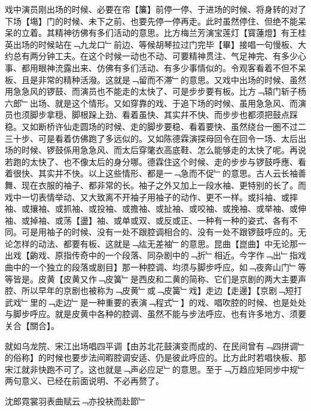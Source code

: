 \documentclass{zhvt-classic}
\begin{document}
戏中演员刚出场的时候、必要在帘【簾】前停一停、于进场的时候、将身转的对了下场【塲】门的时候、未下之前、也要先停一停再走。此时虽然停住、但绝不能呆呆的立着。其精神彷佛有多们活动的意思。比方梅兰芳演宝莲灯【寳蓮燈】有王桂英出场的时候站在﹁九龙口﹂前边、等候胡琴拉过门完毕【畢】接唱一句慢板、大约总有两分钟工夫。在这个时候一动也不动、可要精神贯注、气足神完、有多少心事、都用眼神㳘露出来、仿佛有多们活动、有多少事情似的。令观客看着不但不呆板、且是非常的精种活潑。这就是﹁留而不滞﹂的意思。又戏中出场的时候、虽然用急急风的锣鼓、而演员也不能走的太快了、可是步步要有板。比方﹁辕门斩子杨六郎﹂出场、就是这个情形。又如穿靠的戏、于追下场的时候、虽用急急风、而演员也须脚步拿穏、脚根跺上劲、看着虽快、其实幷不快、而步步也都须把鼓点踩稳。又如断桥许仙走圆场的时候、走的脚步要稳、看着要快、虽然绕台一圏不过二三十步、可是看着仿佛跑了多远似的。又如陈德霖演探母回令在回令一场、太后出场的时候、锣鼓係用急急风、而太后穿氅衣高底鞋、怎么能够走的太快了呢。再说若跑的太快了、也不像太后的身分哪。德霖住这个时候、走的步步与锣鼓呼應、看着很快、其实并不快。以上这些情形、都是一﹁急而不促﹂的意思。古人云长袖善舞、现在衣服的袖子、都非常的长。袖子之外又加上一段水袖、更特别的长了。而戏中一切表情举动、又大致离不开袖子用袖子的动作、更不一样。或抖袖、或摔袖、或攘袖、或抓袖、或投袖、或擔袖、或扯袖、或咬袖、或挽袖、或举袖、或伸袖、或掉袖、或荡【盪】袖、或单或双、或反或正、一种有一种的姿式、各有不同。可是用袖子的时候、没有一处不跟腔调相合的、没有一处不跟锣鼓呼应的。无论怎样的动法、都要有板、这就是﹁纮无差袖﹂的意思。昆曲【崑曲】中无论那一出戏【齣戏、原指传奇中的一个段落、同杂剧中的﹁折﹂相近。今字作﹁出﹂指戏曲中的一个独立的段落或剧目】那一种腔调、均须与脚步呼应。如﹁夜奔山门﹂等等皆是。皮黄【皮黄又作﹁皮簧﹂是西皮和二黄的简称、它们是京剧的两大主要声腔、所以早年的京剧也被称为﹁皮黄﹂或﹁皮簧﹂戏】走边【走邊】【京剧﹁短打武戏﹂里的﹁走边﹂是一种重要的表演﹁程式﹂】的戏、唱吹腔的时候、也是处处与脚步呼应。就是皮黄中各种的腔调、虽然不能与步法呼应、也有许多地方、须要关合【關合】。

就如乌龙院、宋江出场唱四平调【由苏北花鼓演变而成的、在民间曾有﹁四拼调﹂的俗称】的时候也要步法间暇腔调安适、仍是彼此呼应的。比方此时若唱快板、那宋江就非快跑不可了。这也就是﹁声必应足﹂的意思。至于﹁万趋应矩同步中规﹂两句意义、已经在前面说明、不必再赘了。

\begin{preface}
沈郎霓裳羽表曲赋云﹁亦投袂而赴節﹂
\end{preface}
\end{document}
